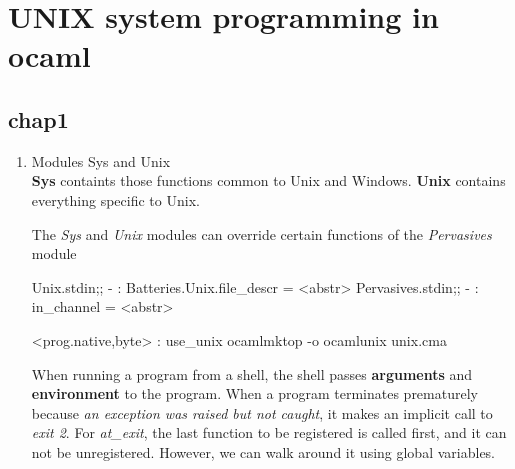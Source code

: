 \section{UNIX system programming in ocaml}
\label{sec:unix-syst-progr}

\subsection{chap1}
\label{sec:chap1}

\begin{enumerate}
\item Modules Sys and Unix \\
  \textbf{Sys} containts those functions common to Unix and Windows.
  \textbf{Unix} contains everything specific to Unix.

  The \textit{Sys} and \textit{Unix} modules can override certain
  functions of the \textit{Pervasives} module
  \begin{alternate}
Unix.stdin;;
- : Batteries.Unix.file_descr = <abstr>
Pervasives.stdin;;
- : in_channel = <abstr>
\end{alternate}

\begin{ocamlcode}
  <prog.{native,byte}> : use_unix
  ocamlmktop -o ocamlunix unix.cma
\end{ocamlcode}

When running a program from a shell, the shell passes \textbf{arguments} and
\textbf{environment} to the program. When a program terminates
prematurely because \textit{an exception was raised but not caught}, it makes
an implicit call to \textit{exit 2}. For \textit{at\_exit}, the last
function to be registered is called first, and it can not be
unregistered. However, we can walk around it using global variables.


\end{enumerate}
